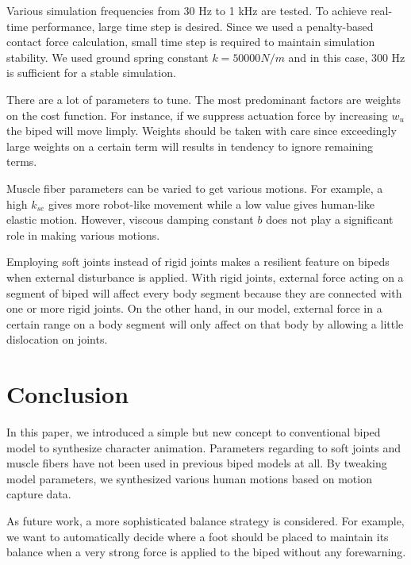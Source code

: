 \documentclass[master,english,final]{kaist-ucs}
\begin{document}
Various simulation frequencies from 30 Hz to 1 kHz
are tested. To achieve real-time performance,
large time step is desired. Since we used
a penalty-based contact force calculation, small
time step is required to maintain simulation stability.
We used ground spring constant $k=50000 N/m$ and
in this case, 300 Hz is sufficient for a stable simulation.

There are a lot of parameters to tune. The most
predominant factors are weights on the cost function.
For instance, if we suppress actuation force by increasing $w_u$
the biped will move limply. Weights should be taken with care since
exceedingly large weights on a certain term will results in
tendency to ignore remaining terms.

Muscle fiber parameters can be varied to get various motions.
For example, a high $k_{se}$ gives more robot-like movement while a low value
gives human-like elastic motion. However, viscous damping constant
$b$ does not play a significant role in making various motions.

Employing soft joints instead of rigid joints makes a resilient
feature on bipeds when external disturbance is applied.
With rigid joints, external force acting on a segment of biped
will affect every body segment because they are connected with
one or more rigid joints. On the other hand, in our model,
external force in a certain range on a body segment will only
affect on that body by allowing a little dislocation on joints.

\chapter{Conclusion}
In this paper, we introduced a simple but new concept to
conventional biped model to synthesize character animation.
Parameters regarding to soft joints and muscle fibers have
not been used in previous biped models at all.
By tweaking model parameters, we synthesized various human
motions based on motion capture data.

As future work, a more sophisticated balance strategy is
considered. For example, we want to automatically decide
where a foot should be placed to maintain its balance
when a very strong force is applied to the biped
without any forewarning.
\end{document}
